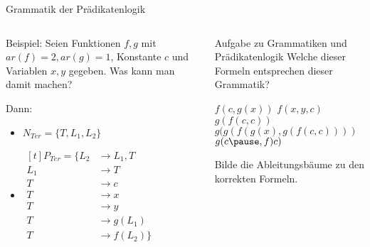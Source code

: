 \begin{frame}{Grammatik der Prädikatenlogik}
	
	
	\begin{columns}
		\begin{column}{0.6\textwidth}
			Beispiel: Seien Funktionen $f,g$ mit $ar(f) = 2, ar(g) = 1$, Konstante $c$ und Variablen $x,y$ gegeben. Was kann man damit machen?\vspace{.2cm}
			
			\bp
			
			Dann: 
			\begin{itemize}
				\item $N_{Ter}=\{ T, L_1, L_2 \}$
				\item $\begin{aligned}[t]
				P_{Ter} = \{  L_2 & \to L_1 , T \\%
				L_1 & \to T  \\
				T   & \to c \\
				T   & \to x \\
				T   & \to y \\
				T   & \to g ( L_1 ) \\
				T   & \to f ( L_2 ) \}
				\end{aligned}
				$
			\end{itemize}
		\end{column}
		
		\begin{column}{0.4\textwidth}
			\bp
			
			\begin{taskblock}{Aufgabe zu Grammatiken und Prädikatenlogik}
				Welche dieser Formeln entsprechen dieser Grammatik?
				\vspace{.2cm}
				\begin{itemize}
					\pitem $f(c, g(x))$
					\pitem $f(x, y, c)$
					\pitem $g(f(c, c))$
					\pitem $g(g(f(g(x), g(f(c, c))))$
					\pitem $g(c\ip, f)c)$
				\end{itemize}
			
				\ip Bilde die Ableitungsbäume zu den korrekten Formeln.
			\end{taskblock}
		\end{column}
	\end{columns}
\end{frame}

